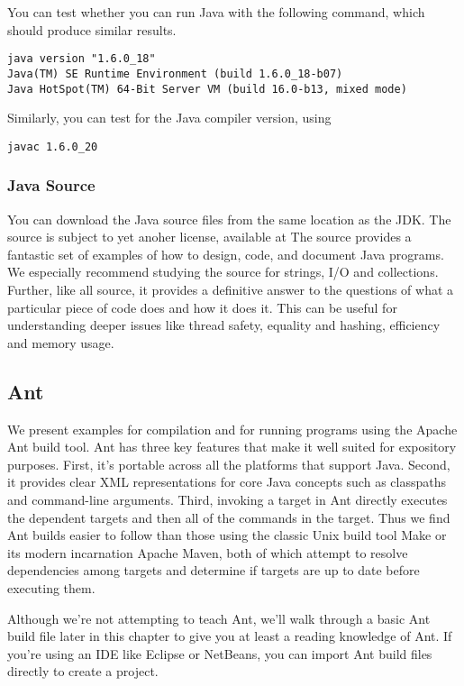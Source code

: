 You can test whether you can run Java with the following command, which
should produce similar results.
%
\begin{verbatim}
java version "1.6.0_18"
Java(TM) SE Runtime Environment (build 1.6.0_18-b07)
Java HotSpot(TM) 64-Bit Server VM (build 16.0-b13, mixed mode)
\end{verbatim}
%
Similarly, you can test for the Java compiler version, using
%
\begin{verbatim}
javac 1.6.0_20
\end{verbatim}


\subsubsection{Java Source}

You can download the Java source files from the same location as the
JDK.  The source is subject to yet anoher license, available at
%
%
The source provides a fantastic set of examples of how to design,
code, and document Java programs.  We especially recommend studying
the source for strings, I/O and collections.  Further, like all
source, it provides a definitive answer to the questions of what a
particular piece of code does and how it does it.  This can be useful
for understanding deeper issues like thread safety, equality and
hashing, efficiency and memory usage.


\subsection{Ant}

We present examples for compilation and for running programs
using the Apache Ant build tool.  Ant has three key features that make
it well suited for expository purposes.  First, it's portable across
all the platforms that support Java.  Second, it provides clear XML
representations for core Java concepts such as classpaths and
command-line arguments.  Third, invoking a target in Ant directly
executes the dependent targets and then all of the commands in the
target.  Thus we find Ant builds easier to follow than those using the
classic Unix build tool Make or its modern incarnation Apache Maven, both
of which attempt to resolve dependencies among targets and determine
if targets are up to date before executing them.

Although we're not attempting to teach Ant, we'll walk through a basic
Ant build file later in this chapter to give you at least a reading
knowledge of Ant.  If you're using an IDE like Eclipse or NetBeans,
you can import Ant build files directly to create a project.

